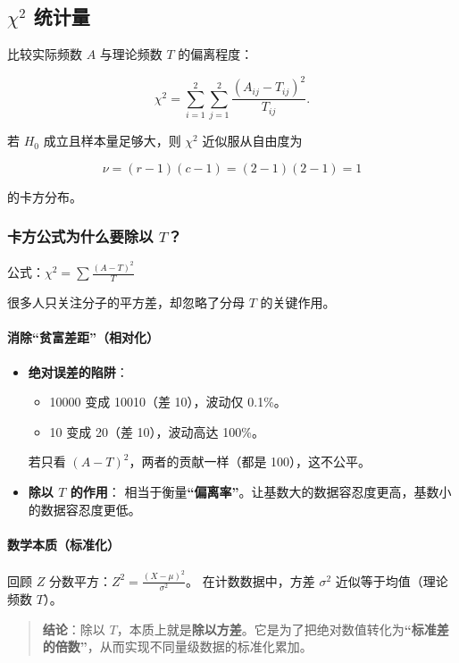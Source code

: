 \documentclass[lang=cn,10pt]{elegantbook}
\begin{document}
\subsection{$\chi^2$ 统计量}
比较实际频数 $A$ 与理论频数 $T$ 的偏离程度：

\begin{equation}
    \chi^2=\sum_{i=1}^{2}\sum_{j=1}^{2}\frac{(A_{ij}-T_{ij})^2}{T_{ij}}.
\end{equation}

若 $H_0$ 成立且样本量足够大，则 $\chi^2$ 近似服从自由度为

\begin{equation}
  \nu=(r-1)(c-1)=(2-1)(2-1)=1
\end{equation}

的卡方分布。

\subsubsection{卡方公式为什么要除以 $T$？}

公式：$\displaystyle \chi^2 = \sum \frac{(A-T)^2}{T}$

很多人只关注分子的平方差，却忽略了分母 $T$ 的关键作用。

\paragraph{消除“贫富差距”（相对化）}
\begin{itemize}
    \item \textbf{绝对误差的陷阱}：
    \begin{itemize}
        \item 10000 变成 10010（差 10），波动仅 0.1\%。
        \item 10 变成 20（差 10），波动高达 100\%。
    \end{itemize}
    若只看 $(A-T)^2$，两者的贡献一样（都是 100），这不公平。
    \item \textbf{除以 $T$ 的作用}：
    相当于衡量\textbf{“偏离率”}。让基数大的数据容忍度更高，基数小的数据容忍度更低。
\end{itemize}

\paragraph{数学本质（标准化）}

回顾 $Z$ 分数平方：$Z^2 = \frac{(X-\mu)^2}{\sigma^2}$。
在计数数据中，方差 $\sigma^2$ 近似等于均值（理论频数 $T$）。
\begin{quote}
    \textbf{结论}：除以 $T$，本质上就是\textbf{除以方差}。它是为了把绝对数值转化为\textbf{“标准差的倍数”}，从而实现不同量级数据的标准化累加。
\end{quote}
\end{document}
